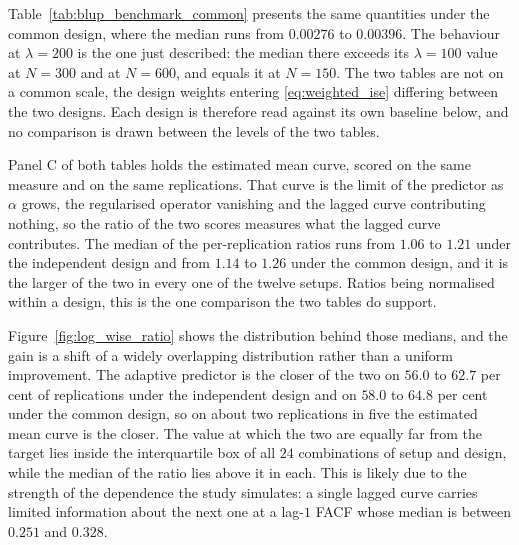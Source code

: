 Table~\ref{tab:blup_benchmark_common} presents the same quantities under the common design, where the median runs from $0.00276$ to $0.00396$. The behaviour at $\lambda = 200$ is the one just described: the median there exceeds its $\lambda = 100$ value at $N = 300$ and at $N = 600$, and equals it at $N = 150$. The two tables are not on a common scale, the design weights entering \eqref{eq:weighted_ise} differing between the two designs. Each design is therefore read against its own baseline below, and no comparison is drawn between the levels of the two tables.

Panel C of both tables holds the estimated mean curve, scored on the same measure and on the same replications. That curve is the limit of the predictor as $\alpha$ grows, the regularised operator vanishing and the lagged curve contributing nothing, so the ratio of the two scores measures what the lagged curve contributes. The median of the per-replication ratios runs from $1.06$ to $1.21$ under the independent design and from $1.14$ to $1.26$ under the common design, and it is the larger of the two in every one of the twelve setups. Ratios being normalised within a design, this is the one comparison the two tables do support.

Figure~\ref{fig:log_wise_ratio} shows the distribution behind those medians, and the gain is a shift of a widely overlapping distribution rather than a uniform improvement. The adaptive predictor is the closer of the two on $56.0$ to $62.7$ per cent of replications under the independent design and on $58.0$ to $64.8$ per cent under the common design, so on about two replications in five the estimated mean curve is the closer. The value at which the two are equally far from the target lies inside the interquartile box of all $24$ combinations of setup and design, while the median of the ratio lies above it in each. This is likely due to the strength of the dependence the study simulates: a single lagged curve carries limited information about the next one at a lag-$1$ FACF whose median is between $0.251$ and $0.328$.

